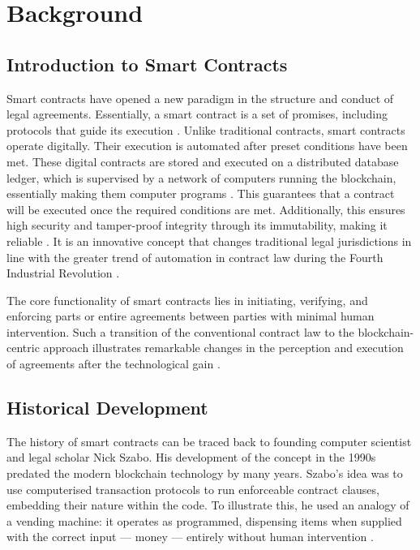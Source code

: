 \chapter{Background}

\section{Introduction to Smart Contracts}

Smart contracts have opened a new paradigm in the structure and conduct of legal agreements. Essentially, a smart contract is a set of promises, including protocols that guide its execution \cite{ZhengEtAl2020}. Unlike traditional contracts, smart contracts operate digitally. Their execution is automated after preset conditions have been met. These digital contracts are stored and executed on a distributed database ledger, which is supervised by a network of computers running the blockchain, essentially making them computer programs \cite{Mik2017}. This guarantees that a contract will be executed once the required conditions are met. Additionally, this ensures high security and tamper-proof integrity through its immutability, making it reliable \cite{Durovic2021}. It is an innovative concept that changes traditional legal jurisdictions in line with the greater trend of automation in contract law during the Fourth Industrial Revolution \cite{Durovic2021}. 

The core functionality of smart contracts lies in initiating, verifying, and enforcing parts or entire agreements between parties with minimal human intervention. Such a transition of the conventional contract law to the blockchain-centric approach illustrates remarkable changes in the perception and execution of agreements after the technological gain \cite{Durovic2021}.

\section{Historical Development}

The history of smart contracts can be traced back to founding computer scientist and legal scholar Nick Szabo. His development of the concept in the 1990s predated the modern blockchain technology by many years. Szabo's idea was to use computerised transaction protocols to run enforceable contract clauses, embedding their nature within the code. To illustrate this, he used an analogy of a vending machine: it operates as programmed, dispensing items when supplied with the correct input — money — entirely without human intervention \cite{Szabo1997}.

